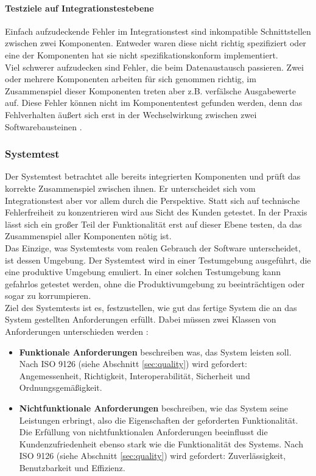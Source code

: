 \paragraph{Testziele auf Integrationstestebene}
Einfach aufzudeckende Fehler im Integrationstest sind inkompatible Schnittstellen zwischen zwei Komponenten. Entweder waren diese nicht richtig spezifiziert oder eine der Komponenten hat sie nicht spezifikationskonform implementiert.\\
Viel schwerer aufzudecken sind Fehler, die beim Datenaustausch passieren. Zwei oder mehrere Komponenten arbeiten für sich genommen richtig, im Zusammenspiel dieser Komponenten treten aber z.B. verfälsche Ausgabewerte auf. Diese Fehler können nicht im Komponententest gefunden werden, denn das Fehlverhalten äußert sich erst in der Wechselwirkung zwischen zwei Softwarebausteinen \cite{spillner_basiswissen_2012}.


\subsubsection{Systemtest}
Der Systemtest betrachtet alle bereits integrierten Komponenten und prüft das korrekte Zusammenspiel zwischen ihnen. Er unterscheidet sich vom Integrationstest aber vor allem durch die Perspektive. Statt sich auf technische Fehlerfreiheit zu konzentrieren wird aus Sicht des Kunden getestet. In der Praxis lässt sich ein großer Teil der Funktionalität erst auf dieser Ebene testen, da das Zusammenspiel aller Komponenten nötig ist.\\
Das Einzige, was Systemtests vom realen Gebrauch der Software unterscheidet, ist dessen Umgebung. Der Systemtest wird in einer Testumgebung ausgeführt, die eine produktive Umgebung emuliert. In einer solchen Testumgebung kann gefahrlos getestet werden, ohne die Produktivumgebung zu beeinträchtigen oder sogar zu korrumpieren.\\
Ziel des Systemtests ist es, festzustellen, wie gut das fertige System die an das System gestellten Anforderungen erfüllt. Dabei müssen zwei Klassen von Anforderungen unterschieden werden \cite{spillner_basiswissen_2012}:

\begin{itemize}
\item \textbf{Funktionale Anforderungen} beschreiben was, das System leisten soll. Nach ISO 9126 (siehe Abschnitt \ref{sec:quality}) wird gefordert: Angemessenheit, Richtigkeit, Interoperabilität, Sicherheit und Ordnungsgemäßigkeit.
\item \textbf{Nichtfunktionale Anforderungen} beschreiben, wie das System seine Leistungen erbringt, also die Eigenschaften der geforderten Funktionalität. Die Erfüllung von nichtfunktionalen Anforderungen beeinflusst die Kundenzufriedenheit ebenso stark wie die Funktionalität des Systems. Nach ISO 9126 (siehe Abschnitt \ref{sec:quality}) wird gefordert: Zuverlässigkeit, Benutzbarkeit und Effizienz.
\end{itemize}


